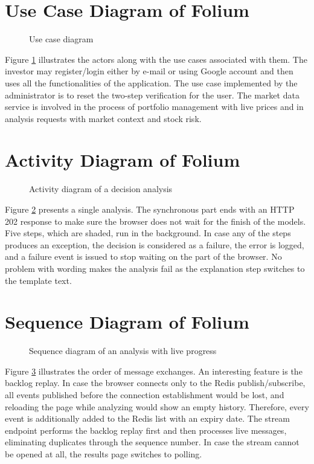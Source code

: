 \section{Use Case Diagram of Folium}
\begin{figure}[H]
\centering
\resizebox{0.95\textwidth}{!}{}
\caption{Use case diagram}
\label{fig:usecase}
\end{figure}

Figure \ref{fig:usecase} illustrates the actors along with the use cases associated with them. The investor may register/login either by e-mail or using Google account and then uses all the functionalities of the application. The use case implemented by the administrator is to reset the two-step verification for the user. The market data service is involved in the process of portfolio management with live prices and in analysis requests with market context and stock risk.

\section{Activity Diagram of Folium}
\begin{figure}[H]
\centering
\resizebox{0.85\textwidth}{!}{}
\caption{Activity diagram of a decision analysis}
\label{fig:activity}
\end{figure}

Figure \ref{fig:activity} presents a single analysis. The synchronous part ends with an HTTP 202 response to make sure the browser does not wait for the finish of the models. Five steps, which are shaded, run in the background. In case any of the steps produces an exception, the decision is considered as a failure, the error is logged, and a failure event is issued to stop waiting on the part of the browser. No problem with wording makes the analysis fail as the explanation step switches to the template text.

\section{Sequence Diagram of Folium}
\begin{figure}[H]
\centering
\resizebox{\textwidth}{!}{}
\caption{Sequence diagram of an analysis with live progress}
\label{fig:sequence}
\end{figure}

Figure \ref{fig:sequence} illustrates the order of message exchanges. An interesting feature is the backlog replay. In case the browser connects only to the Redis publish/subscribe, all events published before the connection establishment would be lost, and reloading the page while analyzing would show an empty history. Therefore, every event is additionally added to the Redis list with an expiry date. The stream endpoint performs the backlog replay first and then processes live messages, eliminating duplicates through the sequence number. In case the stream cannot be opened at all, the results page switches to polling.

